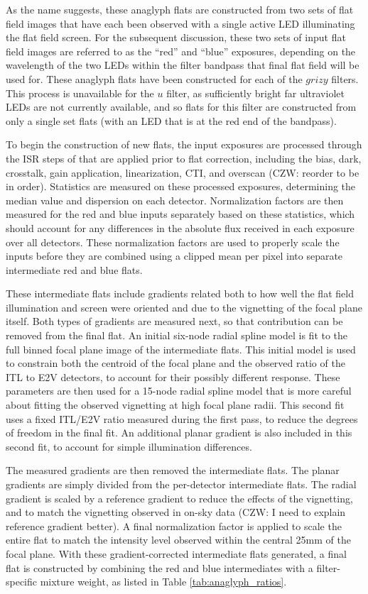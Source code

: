 As the name suggests, these anaglyph flats are constructed from two sets of flat field images that have each been observed with a single active LED illuminating the flat field screen.
For the subsequent discussion, these two sets of input flat field images are referred to as the ``red'' and ``blue'' exposures, depending on the wavelength of the two LEDs within the filter bandpass that final flat field will be used for.
These anaglyph flats have been constructed for each of the $grizy$ filters.
This process is unavailable for the $u$ filter, as sufficiently bright far ultraviolet LEDs are not currently available, and so flats for this filter are constructed from only a single set flats (with an LED that is at the red end of the bandpass).

To begin the construction of new flats, the input exposures are processed through the ISR steps of that are applied prior to flat correction, including the bias, dark, crosstalk, gain application, linearization, CTI, and overscan (CZW: reorder to be in order).
Statistics are measured on these processed exposures, determining the median value and dispersion on each detector.
Normalization factors are then measured for the red and blue inputs separately based on these statistics, which should account for any differences in the absolute flux received in each exposure over all detectors.
These normalization factors are used to properly scale the inputs before they are combined using a clipped mean per pixel into separate intermediate red and blue flats.

These intermediate flats include gradients related both to how well the flat field illumination and screen were oriented and due to the vignetting of the focal plane itself.
Both types of gradients are measured next, so that contribution can be removed from the final flat.
An initial six-node radial spline model is fit to the full binned focal plane image of the intermediate flats.
This initial model is used to constrain both the centroid of the focal plane and the observed ratio of the ITL to E2V detectors, to account for their possibly different response.
These parameters are then used for a 15-node radial spline model that is more careful about fitting the observed vignetting at high focal plane radii.
This second fit uses a fixed ITL/E2V ratio measured during the first pass, to reduce the degrees of freedom in the final fit.
An additional planar gradient is also included in this second fit, to account for simple illumination differences.

The measured gradients are then removed the intermediate flats.
The planar gradients are simply divided from the per-detector intermediate flats.
The radial gradient is scaled by a reference gradient to reduce the effects of the vignetting, and to match the vignetting observed in on-sky data (CZW: I need to explain reference gradient better).
A final normalization factor is applied to scale the entire flat to match the intensity level observed within the central 25mm of the focal plane.
With these gradient-corrected intermediate flats generated, a final flat is constructed by combining the red and blue intermediates with a filter-specific mixture weight, as listed in Table \ref{tab:anaglyph_ratios}.

